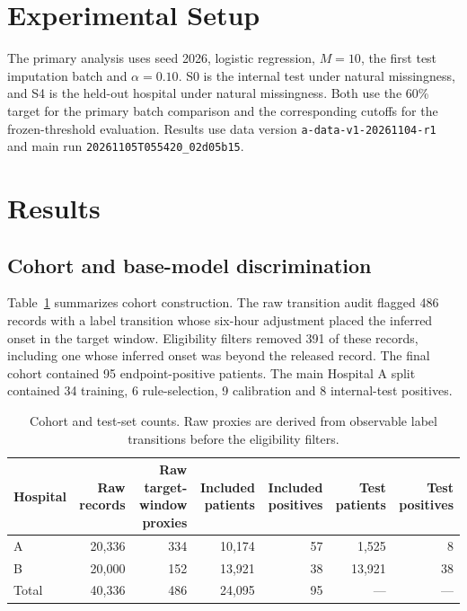 \section{Experimental Setup}

The primary analysis uses seed 2026, logistic regression, $M=10$, the first test imputation batch and $\alpha=0.10$. S0 is the internal test under natural missingness, and S4 is the held-out hospital under natural missingness. Both use the 60\% target for the primary batch comparison and the corresponding cutoffs for the frozen-threshold evaluation. Results use data version \texttt{a-data-v1-20261104-r1} and main run \texttt{20261105T055420\_02d05b15}.

\section{Results}

\subsection{Cohort and base-model discrimination}

Table~\ref{tab:cohort} summarizes cohort construction. The raw transition audit flagged 486 records with a label transition whose six-hour adjustment placed the inferred onset in the target window. Eligibility filters removed 391 of these records, including one whose inferred onset was beyond the released record. The final cohort contained 95 endpoint-positive patients. The main Hospital A split contained 34 training, 6 rule-selection, 9 calibration and 8 internal-test positives.

\begin{table}[t]
\centering
\small
\caption{Cohort and test-set counts. Raw proxies are derived from observable label transitions before the eligibility filters.}
\label{tab:cohort}
\begin{tabular}{@{}lrrrrrr@{}}
\toprule
Hospital & Raw records & Raw target-window proxies & Included patients & Included positives & Test patients & Test positives \\
\midrule
A & 20{,}336 & 334 & 10{,}174 & 57 & 1{,}525 & 8 \\
B & 20{,}000 & 152 & 13{,}921 & 38 & 13{,}921 & 38 \\
Total & 40{,}336 & 486 & 24{,}095 & 95 & --- & --- \\
\bottomrule
\end{tabular}
\end{table}

